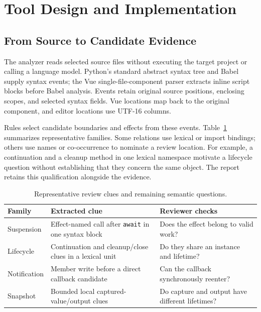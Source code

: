 \section{Tool Design and Implementation}
\label{sec:tool}
\subsection{From Source to Candidate Evidence}
The analyzer reads selected source files without executing the target project or calling a language model. Python's standard abstract syntax tree and Babel supply syntax events; the Vue single-file-component parser extracts inline script blocks before Babel analysis. Events retain original source positions, enclosing scopes, and selected syntax fields. Vue locations map back to the original component, and editor locations use UTF-16 columns.

Rules select candidate boundaries and effects from these events. Table~\ref{tab:rules} summarizes representative families. Some relations use lexical or import bindings; others use names or co-occurrence to nominate a review location. For example, a continuation and a cleanup method in one lexical namespace motivate a lifecycle question without establishing that they concern the same object. The report retains this qualification alongside the evidence.

\begin{table}[t]
\caption{Representative review clues and remaining semantic questions.}
\label{tab:rules}
\centering\footnotesize
\begin{tabular}{>{\raggedright\arraybackslash}p{}>{\raggedright\arraybackslash}p{}>{\raggedright\arraybackslash}p{}}
\toprule
Family & Extracted clue & Reviewer checks \\
\midrule
Suspension & Effect-named call after \texttt{await} in one syntax block & Does the effect belong to valid work? \\
Lifecycle & Continuation and cleanup/close clues in a lexical unit & Do they share an instance and lifetime? \\
Notification & Member write before a direct callback candidate & Can the callback synchronously reenter? \\
Snapshot & Bounded local captured-value/output clues & Do capture and output have different lifetimes? \\
\bottomrule
\end{tabular}
\end{table}

